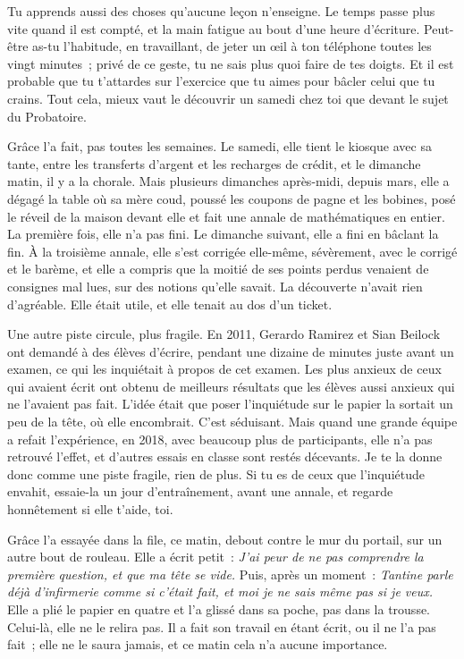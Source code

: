 \documentclass[10.5pt,twoside,openright]{book}
\begin{document}
Tu apprends aussi des choses qu’aucune leçon n’enseigne. Le temps passe plus vite quand il est compté, et la main fatigue au bout d’une heure d’écriture. Peut-être as-tu l’habitude, en travaillant, de jeter un œil à ton téléphone toutes les vingt minutes ; privé de ce geste, tu ne sais plus quoi faire de tes doigts. Et il est probable que tu t’attardes sur l’exercice que tu aimes pour bâcler celui que tu crains. Tout cela, mieux vaut le découvrir un samedi chez toi que devant le sujet du Probatoire.

Grâce l’a fait, pas toutes les semaines. Le samedi, elle tient le kiosque avec sa tante, entre les transferts d’argent et les recharges de crédit, et le dimanche matin, il y a la chorale. Mais plusieurs dimanches après-midi, depuis mars, elle a dégagé la table où sa mère coud, poussé les coupons de pagne et les bobines, posé le réveil de la maison devant elle et fait une annale de mathématiques en entier. La première fois, elle n’a pas fini. Le dimanche suivant, elle a fini en bâclant la fin. À la troisième annale, elle s’est corrigée elle-même, sévèrement, avec le corrigé et le barème, et elle a compris que la moitié de ses points perdus venaient de consignes mal lues, sur des notions qu’elle savait. La découverte n’avait rien d’agréable. Elle était utile, et elle tenait au dos d’un ticket.

Une autre piste circule, plus fragile. En 2011, Gerardo Ramirez et Sian Beilock ont demandé à des élèves d’écrire, pendant une dizaine de minutes juste avant un examen, ce qui les inquiétait à propos de cet examen. Les plus anxieux de ceux qui avaient écrit ont obtenu de meilleurs résultats que les élèves aussi anxieux qui ne l’avaient pas fait. L’idée était que poser l’inquiétude sur le papier la sortait un peu de la tête, où elle encombrait. C’est séduisant. Mais quand une grande équipe a refait l’expérience, en 2018, avec beaucoup plus de participants, elle n’a pas retrouvé l’effet, et d’autres essais en classe sont restés décevants. Je te la donne donc comme une piste fragile, rien de plus. Si tu es de ceux que l’inquiétude envahit, essaie-la un jour d’entraînement, avant une annale, et regarde honnêtement si elle t’aide, toi.

Grâce l’a essayée dans la file, ce matin, debout contre le mur du portail, sur un autre bout de rouleau. Elle a écrit petit : \emph{J’ai peur de ne pas comprendre la première question, et que ma tête se vide.} Puis, après un moment : \emph{Tantine parle déjà d’infirmerie comme si c’était fait, et moi je ne sais même pas si je veux.} Elle a plié le papier en quatre et l’a glissé dans sa poche, pas dans la trousse. Celui-là, elle ne le relira pas. Il a fait son travail en étant écrit, ou il ne l’a pas fait ; elle ne le saura jamais, et ce matin cela n’a aucune importance.
\end{document}
